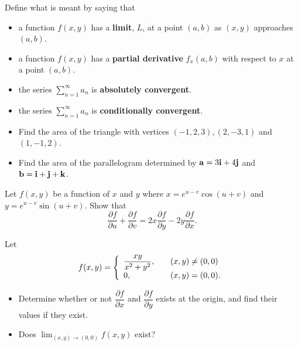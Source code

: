 \documentclass[12pt]{uz-exame}
\begin{document}
 
\rubric{\science}
\makeheading
\sectionAscience
\begin{question}
Define what is meant by saying that 
\begin{itemize}
\item[(a)] a function $f(x,y)$ has a \textbf{limit}, $L$, at a point $(a,b)$ as $(x,y)$ approaches $(a,b)$. 
\item[(b)] a function $f(x,y)$ has a \textbf{partial derivative} $f_x(a,b)$ with respect to $x$ at a point $(a,b)$. 
\item[(c)] the series $\displaystyle \sum _{n=1}^\infty a_n$ is \textbf{absolutely convergent}.
\item[(d)] the series $\displaystyle \sum _{n=1}^\infty a_n$ is \textbf{conditionally convergent}.
\end{itemize}
\end{question}
\begin{question}
\begin{itemize}
\item[(a)] Find the area of the triangle with vertices $(-1,2,3), (2,-3,1)$ and $(1,-1,2)$.
\item[(b)] Find the area of the parallelogram determined by ${\bf{a}}=3{\bf{i}}+4{\bf{j}}$ and ${\bf{b}}={\bf{i}}+{\bf{j}}+{\bf{k}}$.
\end{itemize}
\end{question}
\begin{question}
 Let $f(x,y)$ be a function of $x$ and $y$ where $x=e^{u-v}\cos (u+v)$ and $y=e^{u-v}\sin (u+v)$. Show that 
\[\dfrac{\partial f}{\partial u}+\dfrac{\partial f}{\partial v}=2x\dfrac{\partial f}{\partial y}-2y\dfrac{\partial f}{\partial x}.\]
\end{question}
\begin{question}
Let \[f(x,y) = \left\{ 
\begin{array}{l l}
  \dfrac{xy}{x^2+y^2}, & \quad (x,y)\neq (0,0)\\
  0, & \quad (x,y)=(0,0).\\ \end{array} \right. \]
  \begin{itemize}
  \item[(a)] Determine whether or not $\dfrac{\partial f}{\partial x}$ and $\dfrac{\partial f}{\partial y}$ exists at the origin, and find their values if they exist.
  \item[(b)] Does $\displaystyle \lim _{(x,y)\rightarrow (0,0)} f(x,y)$ exist? 
  \end{itemize}
\end{question}
\end{document}
